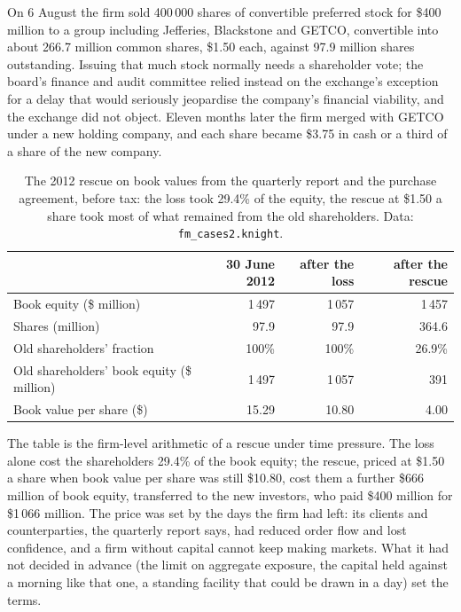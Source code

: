 On 6 August the firm sold 400\,000 shares of convertible preferred stock for \$400 million to a group including Jefferies, Blackstone and GETCO,
convertible into about 266.7 million common shares, \$1.50 each, against 97.9 million shares outstanding. Issuing that much stock normally needs a
shareholder vote; the board's finance and audit committee relied instead on the exchange's exception for a delay that would seriously jeopardise the
company's financial viability, and the exchange did not object. Eleven months later the firm merged with GETCO under a new holding company, and each
share became \$3.75 in cash or a third of a share of the new company.

\begin{table}[ht]
\centering
\begin{tabular}{lrrr}
\toprule
 & 30 June 2012 & after the loss & after the rescue \\
\midrule
Book equity (\$ million) & 1\,497 & 1\,057 & 1\,457 \\
Shares (million) & 97.9 & 97.9 & 364.6 \\
Old shareholders' fraction & 100\% & 100\% & 26.9\% \\
Old shareholders' book equity (\$ million) & 1\,497 & 1\,057 & 391 \\
Book value per share (\$) & 15.29 & 10.80 & 4.00 \\
\bottomrule
\end{tabular}
\caption{The 2012 rescue on book values from the quarterly report and the purchase agreement, before tax: the loss took 29.4\% of the equity, the
rescue at \$1.50 a share took most of what remained from the old shareholders. Data: \texttt{fm\_cases2.knight}.}\label{tab:fm:case-studies-ii:rescue}
\end{table}

The table is the firm-level arithmetic of a rescue under time pressure. The loss alone cost the shareholders 29.4\% of the book equity; the rescue,
priced at \$1.50 a share when book value per share was still \$10.80, cost them a further \$666 million of book equity, transferred to the new
investors, who paid \$400 million for \$1\,066 million. The price was set by the days the firm had left: its clients and counterparties, the
quarterly report says, had reduced order flow and lost confidence, and a firm without capital cannot keep making markets. What it had not decided in
advance (the limit on aggregate exposure, the capital held against a morning like that one, a standing facility that could be drawn in a day) set the
terms.

